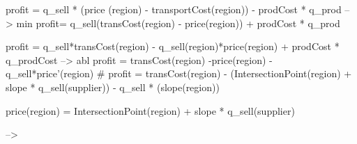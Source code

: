 profit = q_sell * (price (region) - transportCost(region)) - prodCost * q_prod
--> min
profit= q_sell(transCost(region) - price(region)) + prodCost * q_prod

profit =  	q_sell*transCost(region)  
			- q_sell(region)*price(region) 
			+ prodCost * q_prodCost
--> abl
profit = 	transCost(region)
			-price(region)
			-q_sell*price'(region)
			#
profit = 	transCost(region)
			- (IntersectionPoint(region) + slope * \sum q_sell(supplier))
			- q_sell * (slope(region))




price(region) = IntersectionPoint(region) + slope * \sum q_sell(supplier)

-->

